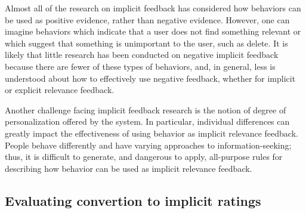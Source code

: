 Almost all of the research on implicit feedback has considered how behaviors
can be used as positive evidence, rather than negative evidence. However, one
can imagine behaviors which indicate that a user does not find something
relevant or which suggest that something is unimportant to the user, such as
delete. It is likely that little research has been conducted on negative
implicit feedback because there are fewer of these types of behaviors, and, in
general, less is understood about how to effectively use negative feedback,
whether for implicit or explicit relevance feedback.

Another challenge facing implicit feedback research is the notion of degree of
personalization offered by the system. In particular, individual differences
can greatly impact the effectiveness of using behavior as implicit relevance
feedback. People behave differently and have varying approaches to
information-seeking; thus, it is difficult to generate, and dangerous to apply,
all-purpose rules for describing how behavior can be used as implicit relevance
feedback.



\subsection{Evaluating convertion to implicit ratings}

